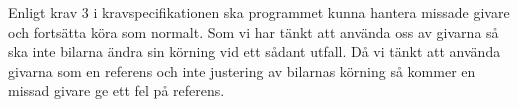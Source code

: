 Enligt krav 3 i kravspecifikationen ska programmet kunna hantera missade givare
och fortsätta köra som normalt. Som vi har tänkt att använda oss av givarna så
ska inte bilarna ändra sin körning vid ett sådant utfall. Då vi tänkt att
använda givarna som en referens och inte justering av bilarnas körning så kommer
en missad givare ge ett fel på referens.

